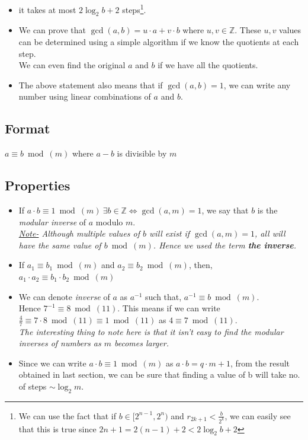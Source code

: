 \begin{mdframed}
\begin{itemize}
	 			\item it takes at most \(2 \log_{2}{b} +2\) steps\footnote{We can use the fact that if \(b \in [2^{n-1}, 2^n)\) and \(r_{2k+1}<\frac{b}{2^{k}}\), we can easily see that this is true since \(2n+1=2(n-1)+2<2 \log_{2}{b} +2\) }.
	 			\item We can prove that \(\gcd(a,b)=u \cdot a + v \cdot b\) where \(u, v \in \mathbb{Z}\). These \(u, v\) values can be determined using a simple algorithm if we know the quotients at each step. \\
	 			We can even find the original \(a\) and \(b\) if we have all the quotients.
	 			\item The above statement also means that if \(\gcd(a,b)=1\), we can write any number using linear combinations of \(a\) and \(b\). 
	 		\end{itemize}
	 \end{mdframed}
	 
	 	\subsection{Format}
	 		\centering \(a \equiv b \bmod(m)\) where \(a-b\) is divisible by $m$ \par
	 		\raggedright  
	 	
	 	\subsection{Properties}
	 	\begin{itemize}
	 		\item If \(a \cdot b \equiv 1 \bmod(m)\ \exists b \in \mathbb{Z} \iff \gcd(a,m)=1\), we say that $b$ is the \emph{modular inverse} of $a$ modulo $m$. \\
	 		\emph{\underline{Note-} Although multiple values of $b$ will exist if \(\gcd(a,m)=1\), all will have the same value of \(b \bmod(m)\). Hence we used the term \textbf{the inverse}.}
	 		\item If \(a_1 \equiv b_1 \bmod(m)\) and \(a_2 \equiv b_2 \bmod(m)\), then, \(a_1 \cdot a_2 \equiv b_1 \cdot b_2 \bmod(m)\)
	 		\item We can denote \emph{inverse} of $a$ as \(a^{-1}\) such that, \(a^{-1} \equiv b \bmod(m)\). \\
	 		Hence \(7^{-1} \equiv 8 \bmod(11)\). This means if we can write \(\frac{4}{7} \equiv 7 \cdot 8 \bmod(11) \equiv 1 \bmod(11)\) as \(4 \equiv 7 \bmod(11)\). \\
	 		\emph{The interesting thing to note here is that it isn't easy to find the modular inverses of numbers as \(m\) becomes larger.}
	 		\item Since we can write \(a \cdot b \equiv 1 \bmod(m)\) as \(a \cdot b= q \cdot m + 1\), from the result obtained in last section, we can be sure that finding a value of b will take no. of steps \(\sim \log_{2}m\).
	 	\end{itemize}

